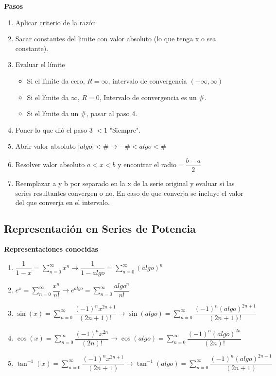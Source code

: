 \textbf{Pasos}
\begin{enumerate}
	\item Aplicar criterio de la razón
	\item Sacar constantes del limite con valor absoluto (lo que tenga x o sea constante).
	\item Evaluar el límite
	\begin{itemize}
		\item Si el límite da cero, $R=\infty$, intervalo de convergencia $(-\infty,\infty)$
		\item Si el límite da $\infty$, $R=0$, Intervalo de convergencia es un $\#$.
		\item Si el límite da un $\#$, pasar al paso 4.
	\end{itemize}
	\item Poner lo que dió el paso 3 $< 1$ "Siempre".
	\item Abrir valor absoluto $|algo|<\# \rightarrow -\#<algo<\#$
	\item Resolver valor absoluto $a<x<b$ y encontrar el radio$=\dfrac{b-a}{2}$
	\item Reemplazar a y b por separado en la x de la serie original y evaluar si las series resultantes convergen o no. En caso de que converja se incluye el valor del que converja en el intervalo.
\end{enumerate}

\subsection{Representación en Series de Potencia}
\textbf{Representaciones conocidas}
\begin{enumerate}
	\item $\dfrac{1}{1-x}=\sum_{n=0}^{\infty}x^n \rightarrow \dfrac{1}{1-algo}=\sum_{n=0}^{\infty}(algo)^n$
	\item $e^x=\sum_{n=0}^{\infty}\dfrac{x^n}{n!} \rightarrow e^{algo}=\sum_{n=0}^{\infty}\dfrac{algo^n}{n!}$
	\item $\sin(x)=\sum_{n=0}^{\infty}\dfrac{(-1)^nx^{2n+1}}{(2n+1)!} \rightarrow \sin(algo)=\sum_{n=0}^{\infty}\dfrac{(-1)^n(algo)^{2n+1}}{(2n+1)!}$
	\item $\cos(x)=\sum_{n=0}^{\infty}\dfrac{(-1)^nx^{2n}}{(2n)!} \rightarrow \cos(algo)=\sum_{n=0}^{\infty}\dfrac{(-1)^n(algo)^{2n}}{(2n)!}$
	\item $\tan^{-1}(x)=\sum_{n=0}^{\infty}\dfrac{(-1)^nx^{2n+1}}{(2n+1)} \rightarrow \tan^{-1}(algo)=\sum_{n=0}^{\infty}\dfrac{(-1)^n(algo)^{2n+1}}{(2n+1)}$
\end{enumerate}

